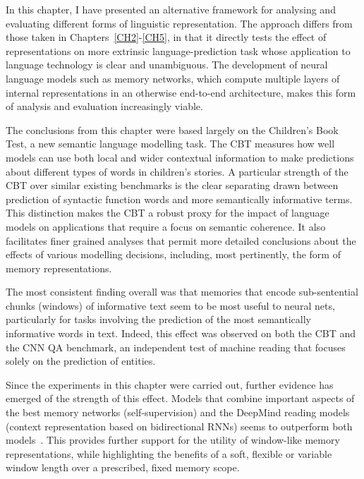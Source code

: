 In this chapter, I have presented an alternative framework for analysing and evaluating different forms of linguistic representation. The approach differs from those taken in Chapters~\ref{CH2}-\ref{CH5}, in that it directly tests the effect of representations on more extrinsic language-prediction task whose application to language technology is clear and unambiguous. The development of neural language models such as memory networks, which compute multiple layers of internal representations in an otherwise end-to-end architecture, makes this form of analysis and evaluation increasingly viable.  

The conclusions from this chapter were based largely on the Children's Book Test, a new semantic language modelling task. The CBT measures how well models can use both local and wider contextual information to make predictions about different types of words in children's stories. A particular strength of the CBT over similar existing benchmarks is the clear separating drawn between prediction of syntactic function words and more semantically informative terms. This distinction makes the CBT a robust proxy for the impact of language models on applications that require a focus on semantic coherence. It also facilitates finer grained analyses that permit more detailed conclusions about the effects of various modelling decisions, including, most pertinently, the form of memory representations. 

The most consistent finding overall was that memories that encode sub-sentential chunks (windows) of informative text seem to be most useful to neural nets, particularly for tasks involving the prediction of the most semantically informative words in text. Indeed, this effect was observed on both the CBT and the CNN QA benchmark, an independent test of machine reading that focuses solely on the prediction of entities. 

Since the experiments in this chapter were carried out, further evidence has emerged of the strength of this effect. Models that combine important aspects of the best memory networks (self-supervision) and the DeepMind reading models (context representation based on bidirectional RNNs) seems to outperform both models~\cite{kadlec2016text}. This provides further support for the utility of window-like memory representations, while highlighting the benefits of a soft, flexible or variable window length over a prescribed, fixed memory scope.  


